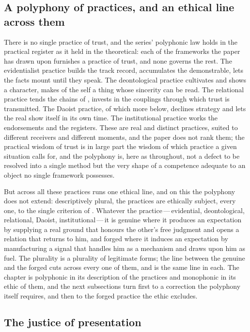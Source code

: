 \subsection{A polyphony of practices, and an ethical line across them}
\label{p13:sub:prax-polyphony}

There is no single practice of trust, and the series' polyphonic law holds in the practical register as it held in the theoretical: each of the frameworks the paper has drawn upon furnishes a practice of trust, and none governs the rest. The evidentialist practice builds the track record, accumulates the demonstrable, lets the facts mount until they speak. The deontological practice cultivates and shows a character, makes of the self a thing whose sincerity can be read. The relational practice tends the chains of , invests in the couplings through which trust is transmitted. The Daoist practice, of which more below, declines strategy and lets the real show itself in its own time. The institutional practice works the endorsements and the registers. These are real and distinct practices, suited to different receivers and different moments, and the paper does not rank them; the practical wisdom of trust is in large part the wisdom of which practice a given situation calls for, and the polyphony is, here as throughout, not a defect to be resolved into a single method but the very shape of a competence adequate to an object no single framework possesses.

But across all these practices runs one ethical line, and on this the polyphony does not extend: descriptively plural, the practices are ethically subject, every one, to the single criterion of . Whatever the practice\,---\,evidential, deontological, relational, Daoist, institutional\,---\,it is genuine where it produces an expectation by supplying a real ground that honours the other's free judgment and opens a relation that returns to him, and forged where it induces an expectation by manufacturing a signal that handles him as a mechanism and draws upon him as fuel. The plurality is a plurality of legitimate forms; the line between the genuine and the forged cuts across every one of them, and is the same line in each. The chapter is polyphonic in its description of the practices and monophonic in its ethic of them, and the next subsections turn first to a correction the polyphony itself requires, and then to the forged practice the ethic excludes.

\subsection{The justice of presentation}
\label{p13:sub:prax-presentation}

